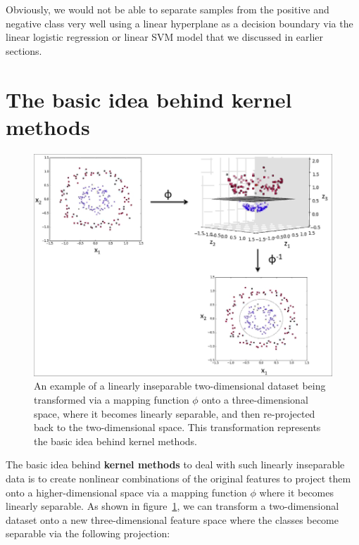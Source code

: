 \documentclass[11pt]{article}
\begin{document}
    Obviously, we would not be able to separate samples from the
    positive and negative class very well using a linear hyperplane
    as a decision boundary via the linear logistic regression or
    linear SVM model that we discussed in earlier sections.

    \section{The basic idea behind kernel methods} \label{sec:kern_idea}

    \begin{figure}[hbt!]
        \centering
        \includegraphics[width=1\linewidth,trim=4 4 4 4,clip]{img/kernel.jpg}
        \caption{An example of a linearly inseparable two-dimensional dataset being transformed via a mapping function $\phi$ onto a three-dimensional space, where it becomes linearly separable, and then re-projected back to the two-dimensional space.
        This transformation represents the basic idea behind kernel methods.}
        \label{fig:kernel}
    \end{figure}

    The basic idea behind \textbf{kernel methods} to deal with such linearly inseparable data is to create nonlinear combinations of the original features to project them onto a higher-dimensional space via a mapping function $\phi$ where it becomes linearly separable.
    As shown in figure~\ref{fig:kernel}, we can transform a two-dimensional dataset onto a new three-dimensional feature space where the classes become separable via the following projection:
\end{document}
